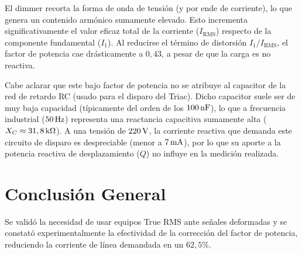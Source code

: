 El dimmer recorta la forma de onda de tensión (y por ende de corriente), lo que genera un contenido armónico sumamente
elevado. Esto incrementa significativamente el valor eficaz total de la corriente ($I_{\text{RMS}}$) respecto de la
componente fundamental ($I_1$). Al reducirse el término de distorsión $I_1/I_{\text{RMS}}$, el factor de potencia cae
drásticamente a $0,43$, a pesar de que la carga es no reactiva.

Cabe aclarar que este bajo factor de potencia no se atribuye al capacitor de la red de retardo RC (usado para el disparo
del Triac). Dicho capacitor suele ser de muy baja capacidad (típicamente del orden de los $100\,\mathrm{nF}$), lo que a frecuencia
industrial ($50\,\mathrm{Hz}$) representa una reactancia capacitiva sumamente alta ($X_C \approx 31,8\,\mathrm{k}\Omega$). A una tensión de
$220\,\mathrm{V}$, la corriente reactiva que demanda este circuito de disparo es despreciable (menor a $7\,\mathrm{mA}$), por lo que su aporte
a la potencia reactiva de desplazamiento ($Q$) no influye en la medición realizada.


\section{Conclusión General}
Se validó la necesidad de usar equipos True RMS ante señales deformadas y se constató experimentalmente la efectividad de la corrección del factor de potencia, reduciendo la corriente de línea demandada en un $62,5\%$.

